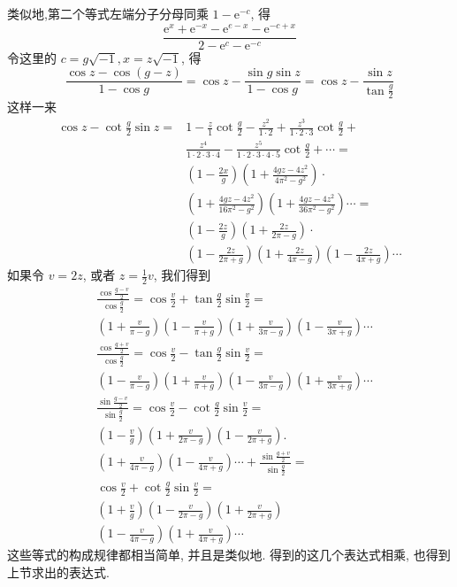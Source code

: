 类似地,第二个等式左端分子分母同乘 $1-\mathrm{e}^{-c}$, 得
\[
\frac{\mathrm{e}^{x}+\mathrm{e}^{-x}-\mathrm{e}^{e-x}-\mathrm{e}^{-c+x}}{2-\mathrm{e}^{c}-\mathrm{e}^{-c}}
\]
令这里的 $c=g \sqrt{-1}, x=z \sqrt{-1}$, 得
\[
\frac{\cos z-\cos (g-z)}{1-\cos g}=\cos z-\frac{\sin g \sin z}{1-\cos g}=\cos z-\frac{\sin z}{\tan \frac{g}{2}}
\]
这样一来
\[
\begin{aligned}
\cos z-\cot \frac{g}{2} \sin z= & 1-\frac{z}{1} \cot \frac{g}{2}-\frac{z^{2}}{1 \cdot 2}+\frac{z^{3}}{1 \cdot 2 \cdot 3} \cot \frac{g}{2}+ \\
& \frac{z^{4}}{1 \cdot 2 \cdot 3 \cdot 4}-\frac{z^{5}}{1 \cdot 2 \cdot 3 \cdot 4 \cdot 5} \cot \frac{g}{2}+\cdots= \\
& \left(1-\frac{2 x}{g}\right)\left(1+\frac{4 g z-4 z^{2}}{4 \pi^{2}-g^{2}}\right) \cdot \\
& \left(1+\frac{4 g z-4 z^{2}}{16 \pi^{2}-g^{2}}\right)\left(1+\frac{4 g z-4 z^{2}}{36 \pi^{2}-g^{2}}\right) \cdots= \\
& \left(1-\frac{2 z}{g}\right)\left(1+\frac{2 z}{2 \pi-g}\right) \cdot \\
& \left(1-\frac{2 z}{2 \pi+g}\right)\left(1+\frac{2 z}{4 \pi-g}\right)\left(1-\frac{2 z}{4 \pi+g}\right) \cdots
\end{aligned}
\]
如果令 $v=2 z$, 或者 $z=\frac{1}{2} v$, 我们得到
\[
\begin{aligned}
& \frac{\cos \frac{g-v}{2}}{\cos \frac{g}{2}}=\cos \frac{v}{2}+\tan \frac{g}{2} \sin \frac{v}{2}= \\
&\left(1+\frac{v}{\pi-g}\right)\left(1-\frac{v}{\pi+g}\right)\left(1+\frac{v}{3 \pi-g}\right)\left(1-\frac{v}{3 \pi+g}\right) \cdots
\end{aligned}
\]
\[
\begin{aligned}
& \frac{\cos \frac{g+v}{2}}{\cos \frac{g}{2}}=\cos \frac{v}{2}-\tan \frac{g}{2} \sin \frac{v}{2}= \\
& \left(1-\frac{v}{\pi-g}\right)\left(1+\frac{v}{\pi+g}\right)\left(1-\frac{v}{3 \pi-g}\right)\left(1+\frac{v}{3 \pi+g}\right) \cdots \\
& \frac{\sin \frac{g-v}{2}}{\sin \frac{g}{2}}=\cos \frac{v}{2}-\cot \frac{g}{2} \sin \frac{v}{2}= \\
& \left(1-\frac{v}{g}\right)\left(1+\frac{v}{2 \pi-g}\right)\left(1-\frac{v}{2 \pi+g}\right) \text {. } \\
& \left(1+\frac{v}{4 \pi-g}\right)\left(1-\frac{v}{4 \pi+g}\right) \cdots+\frac{\sin \frac{g+v}{2}}{\sin \frac{g}{2}}= \\
& \cos \frac{v}{2}+\cot \frac{g}{2} \sin \frac{v}{2}= \\
& \left(1+\frac{v}{g}\right)\left(1-\frac{v}{2 \pi-g}\right)\left(1+\frac{v}{2 \pi+g}\right) \\
& \left(1-\frac{v}{4 \pi-g}\right)\left(1+\frac{v}{4 \pi+g}\right) \cdots
\end{aligned}
\]
这些等式的构成规律都相当简单, 并且是类似地. 得到的这几个表达式相乘, 也得到 上节求出的表达式. 

